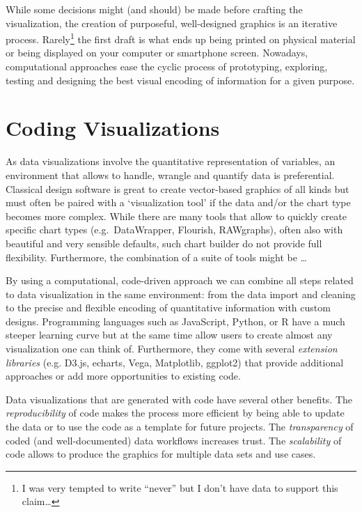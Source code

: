 \documentclass[
]{krantz}
\begin{document}
While some decisions might (and should) be made before crafting the
visualization, the creation of purposeful, well-designed graphics is an
iterative process. Rarely\footnote{I was very tempted to write ``never'' but I don't have
  data to support this claim\ldots{}} the first draft is what ends
up being printed on physical material or being displayed on your
computer or smartphone screen. Nowadays, computational approaches ease
the cyclic process of prototyping, exploring, testing and designing the
best visual encoding of information for a given purpose.

\hypertarget{coding-visualizations}{%
\section{Coding Visualizations}\label{coding-visualizations}}

As data visualizations involve the quantitative representation of
variables, an environment that allows to handle, wrangle and quantify
data is preferential. Classical design software is great to create
vector-based graphics of all kinds but must often be paired with a
`visualization tool' if the data and/or the chart type becomes more
complex. While there are many tools that allow to quickly create
specific chart types (e.g.~DataWrapper, Flourish, RAWgraphs), often also
with beautiful and very sensible defaults, such chart builder do not
provide full flexibility. Furthermore, the combination of a suite of
tools might be \ldots{}

By using a computational, code-driven approach we can combine all steps
related to data visualization in the same environment: from the data
import and cleaning to the precise and flexible encoding of quantitative
information with custom designs. Programming languages such as
JavaScript, Python, or R have a much steeper learning curve but at the
same time allow users to create almost any visualization one can think
of. Furthermore, they come with several \emph{extension libraries} (e.g.
D3.js, echarts, Vega, Matplotlib, ggplot2) that provide additional
approaches or add more opportunities to existing code.

Data visualizations that are generated with code have several other
benefits. The \emph{reproducibility} of code makes the process more efficient
by being able to update the data or to use the code as a template for
future projects. The \emph{transparency} of coded (and well-documented) data
workflows increases trust. The \emph{scalability} of code allows to produce
the graphics for multiple data sets and use cases.
\end{document}
